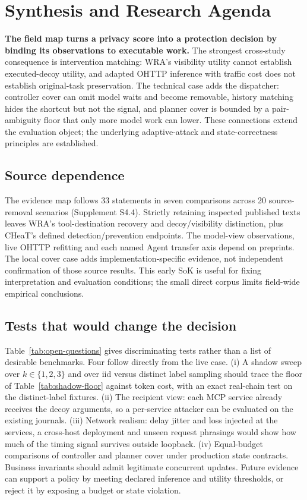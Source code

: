 \section{Synthesis and Research Agenda}\label{sec:agenda}
\textbf{The field map turns a privacy score into a protection decision by binding its observations to executable work.}
The strongest cross-study consequence is intervention matching: WRA's visibility utility cannot establish executed-decoy utility, and adapted OHTTP inference with traffic cost does not establish original-task preservation. The technical case adds the dispatcher: controller cover can omit model waits and become removable, history matching hides the shortcut but not the signal, and planner cover is bounded by a pair-ambiguity floor that only more model work can lower. These connections extend the evaluation object; the underlying adaptive-attack and state-correctness principles are established.

\subsection{Source dependence}\label{sec:sensitivity}
The evidence map follows 33 statements in seven comparisons across 20 source-removal scenarios (Supplement S4.4). Strictly retaining inspected published texts leaves WRA's tool-destination recovery and decoy/visibility distinction, plus CHeaT's defined detection/prevention endpoints. The model-view observations, live OHTTP refitting and each named Agent transfer axis depend on preprints. The local cover case adds implementation-specific evidence, not independent confirmation of those source results. This early SoK is useful for fixing interpretation and evaluation conditions; the small direct corpus limits field-wide empirical conclusions.

\subsection{Tests that would change the decision}
Table~\ref{tab:open-questions} gives discriminating tests rather than a list of desirable benchmarks. Four follow directly from the live case. (i) A shadow sweep over $k\in\{1,2,3\}$ and over iid versus distinct label sampling should trace the floor of Table~\ref{tab:shadow-floor} against token cost, with an exact real-chain test on the distinct-label fixtures. (ii) The recipient view: each MCP service already receives the decoy arguments, so a per-service attacker can be evaluated on the existing journals. (iii) Network realism: delay jitter and loss injected at the services, a cross-host deployment and unseen request phrasings would show how much of the timing signal survives outside loopback. (iv) Equal-budget comparisons of controller and planner cover under production state contracts. Business invariants should admit legitimate concurrent updates. Future evidence can support a policy by meeting declared inference and utility thresholds, or reject it by exposing a budget or state violation.


